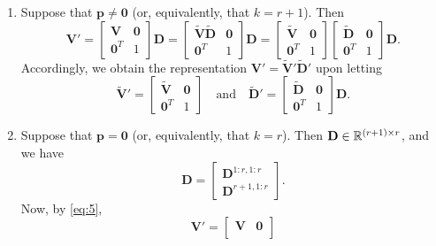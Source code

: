\documentclass[11pt,a4paper]{article}
\theoremstyle{mybreak}
\numberwithin{dummy}{section}
\theoremstyle{plain}
\theoremstyle{plain}
\theoremstyle{plain}
\theoremstyle{plain}
\theoremstyle{MyNonumberplain}
\newcommand{\0}{\M{0}}
\newcommand{\M}[1]{\mathbf{#1}}
\newcommand{\Mt}[1]{\tilde{\M{#1}}}
\newcommand{\R}{\mathbb{R}}
\newcommand{\ve}[1]{\mathbf{#1}}
\newcommand{\Mat}[2]{%
  \ifthenelse{\equal{#2}{1}}
  {\R^{#1}}
  {\R^{#1 \times #2}}
}
\begin{document}
\begin{enumerate}[font=\upshape,label=(\roman*),wide,align=right]
\item Suppose that $\ve{p} \neq \0$ (or, equivalently, that $k= r + 1$).  Then
\begin{displaymath}
  \M{V}' =
  \begin{bmatrix}
    \M{V} & \0
    \\
    \0^T & 1
  \end{bmatrix}
  \M{D}
  =
  \begin{bmatrix}
    \Mt{V} \Mt{D} & \0
    \\
    \0^T & 1
  \end{bmatrix}
  \M{D}
  =
  \begin{bmatrix}
    \Mt{V} & \0
    \\
    \0^T & 1
  \end{bmatrix}
  \begin{bmatrix}
    \Mt{D} & \0
    \\
    \0^T & 1
  \end{bmatrix}
  \M{D}.
\end{displaymath}
Accordingly, we obtain the representation
\begin{math}
  \M{V}' = \Mt{V}' \Mt{D}'
\end{math}
upon letting
\begin{displaymath}
  \Mt{V}' =
  \begin{bmatrix}
    \Mt{V} & \0
    \\
    \0^T & 1
  \end{bmatrix}
  \quad
  \text{and}
  \quad
  \Mt{D}' =
  \begin{bmatrix}
    \Mt{D} & \0
    \\
    \0^T & 1
  \end{bmatrix}
  \M{D}.
\end{displaymath}
\item Suppose that $\ve{p} = \0$ (or, equivalently, that $k = r$).  Then $\M{D} \in \Mat{(r+1)}{r}$, and we have
  \begin{displaymath}
    \M{D}
    =
    \begin{bmatrix}
      \M{D}^{1:r,1:r}
      \\
      \M{D}^{r+1,1:r}
    \end{bmatrix}.
  \end{displaymath}
  Now, by \eqref{eq:5}, 
  \begin{displaymath}
    \M{V}' =
    \begin{bmatrix}
      \M{V} & \0
      \\

\end{bmatrix}
\end{displaymath}
\end{enumerate}
\end{document}
